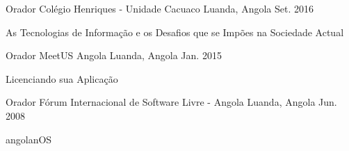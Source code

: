 


\begin{cventries}


\cventry
{Orador} %
{Colégio Henriques - Unidade Cacuaco} %
{Luanda, Angola} %
{Set. 2016} %
{ %
\begin{cvitems}
\item {As Tecnologias de Informação e os Desafios que se Impões na Sociedade Actual}
\end{cvitems}
}


\cventry
{Orador} %
{MeetUS Angola} %
{Luanda, Angola} %
{Jan. 2015} %
{ %
\begin{cvitems}
\item {Licenciando sua Aplicação}
\end{cvitems}
}


\cventry
{Orador} %
{Fórum Internacional de Software Livre - Angola} %
{Luanda, Angola} %
{Jun. 2008} %
{ %
\begin{cvitems}
\item {angolanOS}
\end{cvitems}
}



\end{cventries}

